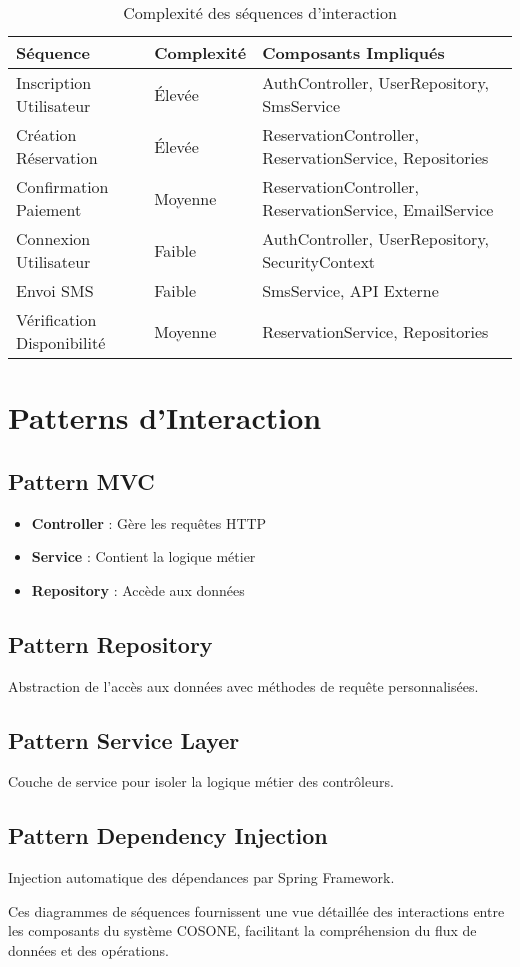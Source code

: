 \documentclass[12pt,a4paper]{article}
\begin{document}
\begin{table}[h]
\centering
\begin{tabular}{|l|l|p{6cm}|}
\hline
\textbf{Séquence} & \textbf{Complexité} & \textbf{Composants Impliqués} \\
\hline
Inscription Utilisateur & Élevée & AuthController, UserRepository, SmsService \\
\hline
Création Réservation & Élevée & ReservationController, ReservationService, Repositories \\
\hline
Confirmation Paiement & Moyenne & ReservationController, ReservationService, EmailService \\
\hline
Connexion Utilisateur & Faible & AuthController, UserRepository, SecurityContext \\
\hline
Envoi SMS & Faible & SmsService, API Externe \\
\hline
Vérification Disponibilité & Moyenne & ReservationService, Repositories \\
\hline
\end{tabular}
\caption{Complexité des séquences d'interaction}
\end{table}

\section{Patterns d'Interaction}

\subsection{Pattern MVC}
\begin{itemize}
    \item \textbf{Controller} : Gère les requêtes HTTP
    \item \textbf{Service} : Contient la logique métier
    \item \textbf{Repository} : Accède aux données
\end{itemize}

\subsection{Pattern Repository}
Abstraction de l'accès aux données avec méthodes de requête personnalisées.

\subsection{Pattern Service Layer}
Couche de service pour isoler la logique métier des contrôleurs.

\subsection{Pattern Dependency Injection}
Injection automatique des dépendances par Spring Framework.

Ces diagrammes de séquences fournissent une vue détaillée des interactions entre les composants du système COSONE, facilitant la compréhension du flux de données et des opérations.
\end{document}
